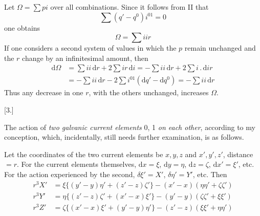 Let $\Omega=\sum pi$ over all combinations. Since it follows from II that
\[
\sum(q'-q^0)i^{01}=0
\]
one obtains
\[
\Omega=\sum iir
\]
If one considers a second system of values in which the $p$ remain unchanged and the $r$ change by an infinitesimal amount, then
\[
\begin{aligned}
\mathrm d\Omega&=\sum ii\,\mathrm dr+2\sum ir\,\mathrm di=-\sum ii\,\mathrm dr+2\sum i\,.\,\mathrm dir\\
&=-\sum ii\,\mathrm dr-2\sum i^{01}(\mathrm dq'-\mathrm dq^0)=-\sum ii\,\mathrm dr
\end{aligned}
\]
Thus any decrease in one $r$, with the others unchanged, increases $\Omega$.

\begin{center}[3.]\end{center}
The action of \textit{two galvanic current elements} 0, 1 \textit{on each other}, according to my conception, which, incidentally, still needs further examination, is as follows.

Let the coordinates of the two current elements be $x,y,z$ and $x',y',z'$, distance $=r$. For the current elements themselves, $\mathrm dx=\xi$, $\mathrm dy=\eta$, $\mathrm dz=\zeta$, $\mathrm dx'=\xi'$, etc. For the action experienced by the second, $\delta\xi'=X'$, $\delta\eta'=Y'$, etc. Then
\[
\begin{aligned}
r^3X'&=\xi\{(y'-y)\eta'+(z'-z)\zeta'\}-(x'-x)(\eta\eta'+\zeta\zeta')\\
r^3Y'&=\eta\{(z'-z)\zeta'+(x'-x)\xi'\}-(y'-y)(\zeta\zeta'+\xi\xi')\\
r^3Z'&=\zeta\{(x'-x)\xi'+(y'-y)\eta'\}-(z'-z)(\xi\xi'+\eta\eta')
\end{aligned}
\]

